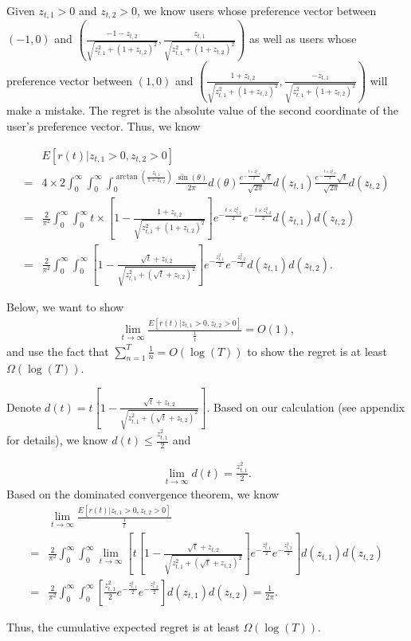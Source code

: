 Given $z_{t,1}>0$ and $z_{t,2}>0$, we know users whose preference vector between $(-1,0)$ and $\left(\frac{-1-z_{t,2}}{\sqrt{z_{t,1}^2+(1+z_{t,2})^2}}, \frac{z_{t,1}}{\sqrt{z_{t,1}^2+(1+z_{t,2})^2}}\right)$ as well as users whose preference vector between $(1,0)$ and $\left(\frac{1+z_{t,2}}{\sqrt{z_{t,1}^2+(1+z_{t,2})^2}}, \frac{-z_{t,1}}{\sqrt{z_{t,1}^2+(1+z_{t,2})^2}}\right)$ will make a mistake. The regret is the absolute value of the second coordinate of the user's preference vector. Thus, we know

\begin{align}
&E[r(t)| z_{t,1}>0, z_{t,2}>0] \nonumber \\
=& 4\times 2 \int_{0}^{\infty} \int_{0}^{\infty} \int_{0}^{\arctan\left(\frac{z_{t,1}}{1+z_{t,2}}\right)}\frac{\sin(\theta)}{2\pi}d(\theta)\frac{e^{-\frac{t \times z_{t,1}^2}{2}}\sqrt{t}}{\sqrt{2\pi}}d(z_{t,1})\frac{e^{-\frac{t \times z_{t,2}^2}{2}}\sqrt{t}}{\sqrt{2\pi}}d(z_{t,2}) \nonumber \\
=& \frac{2}{\pi^2}\int_{0}^{\infty} \int_{0}^{\infty}t\times \left[1-\frac{1+z_{t,2}}{\sqrt{z_{t,1}^2+(1+z_{t,2})^2}}\right]e^{-\frac{t \times z_{t,1}^2}{2}}e^{-\frac{t \times z_{t,2}^2}{2}}d(z_{t,1})d(z_{t,2}) \nonumber \\
=& \frac{2}{\pi^2}\int_{0}^{\infty} \int_{0}^{\infty} \left[1-\frac{\sqrt{t}+z_{t,2}}{\sqrt{z_{t,1}^2+(\sqrt{t}+z_{t,2})^2}}\right]e^{-\frac{z_{t,1}^2}{2}}e^{-\frac{z_{t,2}^2}{2}}d(z_{t,1})d(z_{t,2}). \nonumber 
\end{align}

Below, we want to show 
\begin{align}
\lim_{t\rightarrow\infty}\frac{E[r(t)| z_{t,1}>0, z_{t,2}>0]}{\frac{1}{t}} = O(1), \nonumber
\end{align}
and use the fact that $\sum_{n=1}^{T}\frac{1}{n}=O(\log(T))$ to show the regret is at least $\Omega(\log(T))$.

Denote $d(t)=t\left[1-\frac{\sqrt{t}+z_{t,2}}{\sqrt{z_{t,1}^2+(\sqrt{t}+z_{t,2})^2}}\right]$. Based on our calculation (see appendix for details), we know $d(t)\leq \frac{z_{t,1}^2}{2}$ and

\begin{align}
\lim_{t\rightarrow \infty} d(t)=\frac{z_{t,1}^2}{2}. \label{ex:limit}
\end{align}
Based on the dominated convergence theorem, we know
\begin{align}
&\lim_{t\rightarrow \infty}\frac{E[r(t)| z_{t,1}>0, z_{t,2}>0]}{\frac{1}{t}} \nonumber \\
=& \frac{2}{\pi^2}\int_{0}^{\infty} \int_{0}^{\infty}\lim_{t\rightarrow \infty}\left[ t\left[1-\frac{\sqrt{t}+z_{t,2}}{\sqrt{z_{t,1}^2+(\sqrt{t}+z_{t,2})^2}}\right]e^{-\frac{z_{t,1}^2}{2}}e^{-\frac{z_{t,2}^2}{2}}\right]d(z_{t,1})d(z_{t,2}) \nonumber  \\
=&\frac{2}{\pi^2}\int_{0}^{\infty} \int_{0}^{\infty}\left[ \frac{z_{t,1}^2}{2}e^{-\frac{z_{t,1}^2}{2}}e^{-\frac{z_{t,2}^2}{2}}\right]d(z_{t,1})d(z_{t,2}) = \frac{1}{2\pi}. \nonumber
\end{align}


Thus, the cumulative expected regret is at least $\Omega(\log(T))$.




